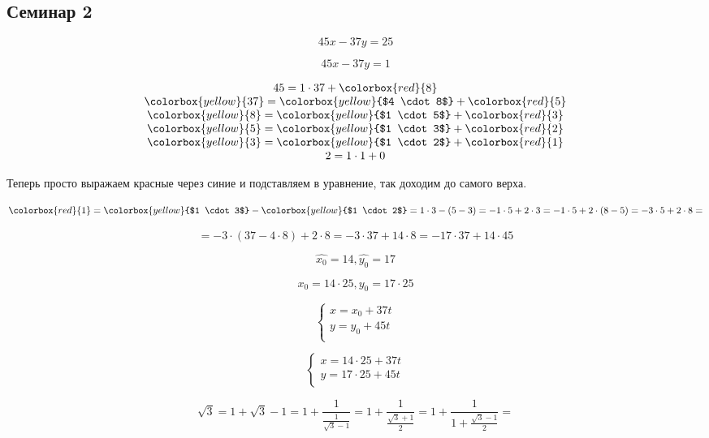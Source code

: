 \subsection{Семинар 2}

$$45x - 37y = 25$$

$$45x - 37y = 1$$

$$
\begin{array}{c}
    45 = 1 \cdot 37 + \colorbox{red}{8}\\
    \colorbox{yellow}{37} = \colorbox{yellow}{$4 \cdot 8$} + \colorbox{red}{5}\\
    \colorbox{yellow}{8} = \colorbox{yellow}{$1 \cdot 5$} + \colorbox{red}{3}\\
    \colorbox{yellow}{5} = \colorbox{yellow}{$1 \cdot 3$} + \colorbox{red}{2}\\
    \colorbox{yellow}{3} = \colorbox{yellow}{$1 \cdot 2$} + \colorbox{red}{1}\\
    2 = 1 \cdot 1 + 0\\
\end{array}$$

Теперь просто выражаем красные через синие и подставляем в уравнение, так доходим до самого верха.

$$\colorbox{red}{1} = \colorbox{yellow}{$1 \cdot 3$} - \colorbox{yellow}{$1 \cdot 2$} = 1 \cdot 3 - (5 - 3) = -1 \cdot 5 + 2 \cdot 3 = -1 \cdot 5 + 2 \cdot (8 - 5) = -3 \cdot 5 + 2 \cdot 8 =$$

$$= -3 \cdot (37 - 4 \cdot 8) + 2 \cdot 8 = - 3 \cdot 37 + 14 \cdot 8 = -17 \cdot 37 + 14 \cdot 45$$

$$\hat{x_0} = 14, \hat{y_0} = 17$$

$$x_0 = 14 \cdot 25, y_0 = 17 \cdot 25$$

$$\begin{cases}
    x = x_0 + 37t\\
    y = y_0 + 45t\\
\end{cases}$$

$$\begin{cases}
    x = 14 \cdot 25 + 37t\\
    y = 17 \cdot 25 + 45t\\
\end{cases}$$



$$\sqrt{3} = 1 + \sqrt{3} - 1 = 1 + \frac{1}{\frac{1}{ \sqrt{3} - 1}} = 1 + \frac{1}{\frac{ \sqrt{3} + 1}{2}} = 1 + \frac{1}{1 + \frac{ \sqrt{3} - 1}{2}} =$$

